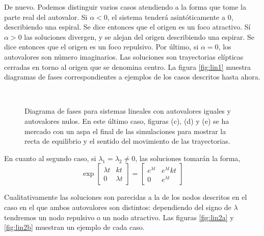 De nuevo. Podemos distinguir varios casos atendiendo a la forma que tome la parte real del autovalor. Si $\alpha < 0$, el sistema tenderá asintóticamente a 0, describiendo una espiral. Se dice entonces que el origen es un foco atractivo. Sí $\alpha > 0$ las soluciones divergen, y se alejan del origen describiendo una espirar. Se dice entonces que el origen es un foco repulsivo. Por último, si $\alpha = 0$, los autovalores son número imaginarios. Las soluciones son trayectorias elípticas cerradas en torno al origen que se denomina centro. La figura \ref{fig:lin1} muestra diagramas de fases correspondientes a ejemplos de los casos descritos hasta ahora.

\begin{figure}
\centering
{}
\\
\caption{Diagrama de fases para sistemas lineales con autovalores iguales y autovalores nulos. En este último caso, figuras (c), (d) y (e) se ha mercado con un aspa el final de las simulaciones para mostrar la recta de equilibrio y el sentido del movimiento de las trayectorias. }\label{fig:lin2}
\end{figure}

En cuanto al segundo caso, si $\lambda_1 = \lambda_2 \ne 0$, las soluciones tomarán la forma,
\begin{equation}
\exp\begin{bmatrix}
\lambda t& kt\\ 0 & \lambda t
\end{bmatrix} = 
\begin{bmatrix}
e^{\lambda t} & e^{\lambda t}kt\\
0 & e^{\lambda t}
\end{bmatrix}
\end{equation}

Cualitativamente las soluciones son parecidas a la de los nodos descritos en el caso en el que ambos autovalores son distintos: dependiendo del signo de $\lambda$ tendremos un nodo repulsivo o un nodo atractivo. Las figuras \ref{fig:lin2a} y \ref{fig:lin2b} muestran un ejemplo de cada caso. 

